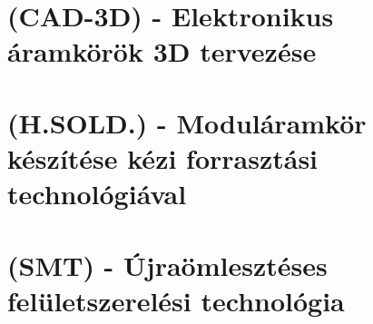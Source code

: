 \documentclass[12pt]{article}
\begin{document}
	\section{(CAD-3D) - Elektronikus áramkörök 3D tervezése}

		





	\section{}







	\section{(H.SOLD.) - Moduláramkör készítése kézi forrasztási technológiával}

		

	\section{(SMT) - Újraömlesztéses felületszerelési technológia}

		
\end{document}
